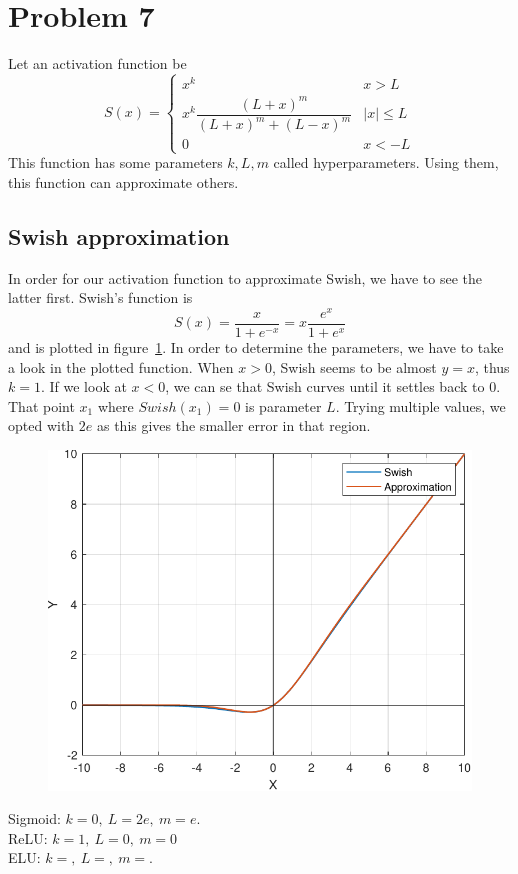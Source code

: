 \section{Problem 7}
Let an activation function be
\begin{equation}
S(x) = \left\{
\begin{array}{cc}
	x^k & x>L\\[1mm]
	x^k \dfrac{\left(L+x\right)^m}{\left(L+x\right)^m + \left(L-x\right)^m} & \left|x\right| \le L\\[1mm]
	0 & x < -L
\end{array}
\right.
\end{equation}
This function has some parameters $k,L,m$ called hyperparameters. Using them, this function can approximate others.
\subsection{Swish approximation}
In order for our activation function to approximate Swish, we have to see the latter first.
Swish's function is 
\[
S(x) = \dfrac{x}{1+e^{-x}} = x\dfrac{e^x}{1+e^x}
\]
and is plotted in figure~\ref{fig:prob7_swish}. In order to determine the parameters, we have to take a look in the plotted function. When $x>0$, Swish seems to be almost $y=x$, thus $k=1$. If we look at $x<0$, we can se that Swish curves until it settles back to 0.
That point $x_1$ where $Swish (x_1) = 0$ is parameter $L$. Trying multiple values, we opted with $2e$ as this gives the smaller error in that region.


\begin{figure}[H]
	\centering
	\includegraphics[width=.5\textwidth]{../Problem 7/prob7_swish.pdf}
	\caption{}
	\label{fig:prob7_swish}
\end{figure}

Sigmoid: $k=0, \ L=2e, \ m=e$.\\
ReLU: $k=1, \ L=0, \ m=0$\\
ELU: $k=, \ L=, \ m=$.